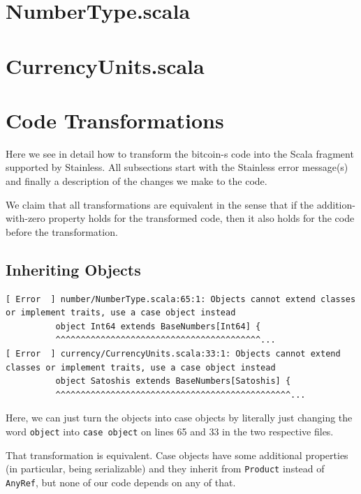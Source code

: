 \documentclass[runningheads]{llncs}
\begin{document}
\section{NumberType.scala}


\section{CurrencyUnits.scala}



\section{Code Transformations} 

Here we see in detail how to transform the bitcoin-s code into the
Scala fragment supported by Stainless. All subsections start with the
Stainless error message(s) and finally a description of the changes we
make to the code.

We claim that all transformations are equivalent in the sense that if
the addition-with-zero property holds for the transformed code, then
it also holds for the code before the transformation.


\subsection{Inheriting Objects}


\begin{lstlisting}[style=stainless]
[ Error  ] number/NumberType.scala:65:1: Objects cannot extend classes or implement traits, use a case object instead
          object Int64 extends BaseNumbers[Int64] {
          ^^^^^^^^^^^^^^^^^^^^^^^^^^^^^^^^^^^^^^^^^...
[ Error  ] currency/CurrencyUnits.scala:33:1: Objects cannot extend classes or implement traits, use a case object instead
          object Satoshis extends BaseNumbers[Satoshis] {
          ^^^^^^^^^^^^^^^^^^^^^^^^^^^^^^^^^^^^^^^^^^^^^^^...
\end{lstlisting}

Here, we can just turn the objects into case objects by literally just
changing the word \texttt{object} into \texttt{case object} on lines
65 and 33 in the two respective files.

That transformation is equivalent. Case objects have some additional
properties (in particular, being serializable) and they inherit from
\texttt{Product} instead of \texttt{AnyRef}, but none of our code
depends on any of that.
\end{document}
